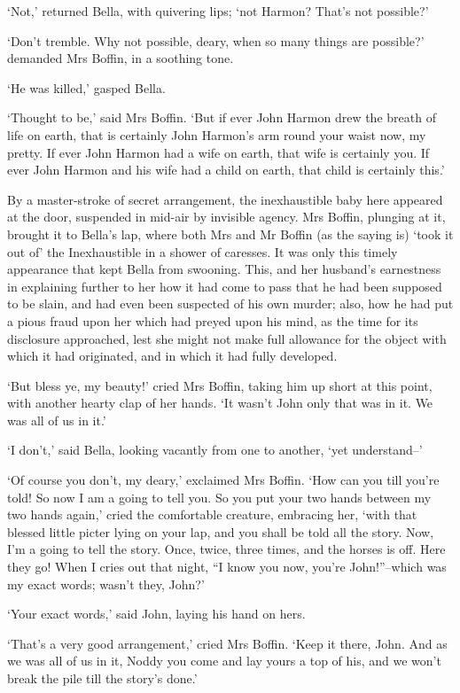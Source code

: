 ‘Not,’ returned Bella, with quivering lips; ‘not Harmon? That’s not
possible?’

‘Don’t tremble. Why not possible, deary, when so many things are
possible?’ demanded Mrs Boffin, in a soothing tone.

‘He was killed,’ gasped Bella.

‘Thought to be,’ said Mrs Boffin. ‘But if ever John Harmon drew the
breath of life on earth, that is certainly John Harmon’s arm round your
waist now, my pretty. If ever John Harmon had a wife on earth, that wife
is certainly you. If ever John Harmon and his wife had a child on earth,
that child is certainly this.’

By a master-stroke of secret arrangement, the inexhaustible baby here
appeared at the door, suspended in mid-air by invisible agency. Mrs
Boffin, plunging at it, brought it to Bella’s lap, where both Mrs and Mr
Boffin (as the saying is) ‘took it out of’ the Inexhaustible in a shower
of caresses. It was only this timely appearance that kept Bella from
swooning. This, and her husband’s earnestness in explaining further to
her how it had come to pass that he had been supposed to be slain, and
had even been suspected of his own murder; also, how he had put a pious
fraud upon her which had preyed upon his mind, as the time for its
disclosure approached, lest she might not make full allowance for
the object with which it had originated, and in which it had fully
developed.

‘But bless ye, my beauty!’ cried Mrs Boffin, taking him up short at this
point, with another hearty clap of her hands. ‘It wasn’t John only that
was in it. We was all of us in it.’

‘I don’t,’ said Bella, looking vacantly from one to another, ‘yet
understand--’

‘Of course you don’t, my deary,’ exclaimed Mrs Boffin. ‘How can you till
you’re told! So now I am a going to tell you. So you put your two hands
between my two hands again,’ cried the comfortable creature, embracing
her, ‘with that blessed little picter lying on your lap, and you shall
be told all the story. Now, I’m a going to tell the story. Once, twice,
three times, and the horses is off. Here they go! When I cries out that
night, “I know you now, you’re John!”--which was my exact words; wasn’t
they, John?’

‘Your exact words,’ said John, laying his hand on hers.

‘That’s a very good arrangement,’ cried Mrs Boffin. ‘Keep it there,
John. And as we was all of us in it, Noddy you come and lay yours a top
of his, and we won’t break the pile till the story’s done.’

